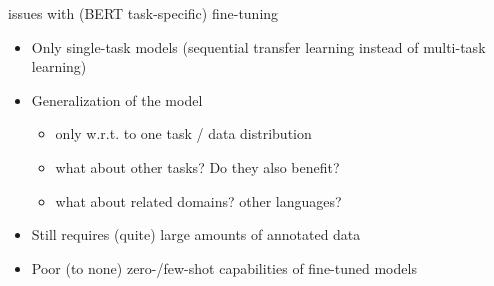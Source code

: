 
\begin{frame}{issues with (BERT task-specific) fine-tuning}

\vfill

\begin{itemize}
    \item Only single-task models (sequential transfer learning instead of multi-task learning)
    \item Generalization of the model 
        \begin{itemize}
            \item only w.r.t. to one task / data distribution
            \item \ques what about other tasks? Do they also benefit?
            \item \ques what about related domains? other languages?
        \end{itemize} 
    \item Still requires (quite) large amounts of annotated data
    \item Poor (to none) zero-/few-shot capabilities of fine-tuned models
\end{itemize}

\vfill

\end{frame}

